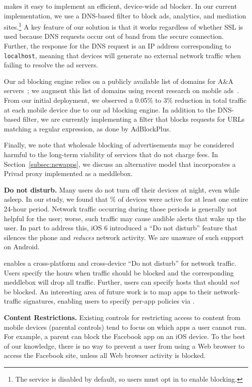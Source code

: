 \meddle makes it easy to implement an efficient, device-wide ad blocker. 
In our current implementation, we use a DNS-based filter to
block ads, analytics, and mediation sites.\footnote{The service is disabled by default, so users must 
opt in to enable blocking.} A key feature of our solution is that it works 
regardless of whether SSL is used because DNS requests occur out of band 
from the secure connection. Further, the response for the DNS request is an IP address corresponding to {\tt localhost}, 
meaning that devices will generate no external network traffic when failing 
to resolve the ad servers. 


Our ad blocking engine relies on a publicly available list of domains for A\&A servers~\cite{YoyoAds}; we augment this list of domains using 
recent research on mobile ads~\cite{hornyack:appfence,
  Leontiadis:2012:AdsMobile}. From our initial deployment, we observed a 0.05\% to 3\% reduction
in total traffic at each mobile device due to our ad blocking engine. 
In addition to the DNS-based filter, we are currently implementing a filter that blocks 
requests for URLs matching a regular expression, as done by AdBlockPlus.

Finally, we note that wholesale blocking of advertisements may be considered harmful 
to the long-term viability of services that do not charge fees. In Section~\ref{subsec:newapps}, 
we discuss an alternative model that incorporates a Privad proxy implemented as a meddlebox. 

\noindent\textbf{Do not disturb.} 
Many users do not turn off their devices at night, even while asleep. In our study, we found that 
\% of devices were active for at least one entire 24-hour period. Network 
traffic occurring during those periods is generally not helpful for the user; worse, 
such traffic may cause audible alerts that wake up the user. In part to address this, 
iOS 6 introduced a ``Do not disturb'' feature that silences the phone and \emph{reduces} 
network activity. We are unaware of such support on Android.

\meddle enables a cross-platform and cross-device ``Do not disturb'' for network 
traffic. Users specify the hours when traffic should be blocked and the corresponding 
meddlebox will drop all traffic. Further, users can specify hosts that should \emph{not} be 
blocked. An interesting area of future work is to map apps to their network-traffic 
signatures, enabling users to specify per-app policies via \meddle.

\noindent\textbf{Content Restrictions.} 
Existing controls for restricting access to content from mobile devices (\eg parental controls) 
tend to focus on which apps a user cannot run. For example, a parent can block the Facebook app on an iOS device. 
To the best of our knowledge, there is no way to prevent a user from using a 
Web browser to access the Facebook site, unless all Web browser activity is blocked. 

